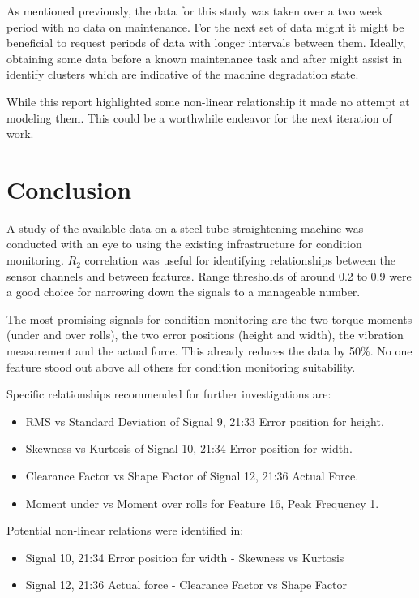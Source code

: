 \documentclass[]{article}
\begin{document}
As mentioned previously, the data for this study was taken over a two week period with no data on maintenance. For the next set of data might it might be beneficial to request periods of data with longer intervals between them. Ideally, obtaining some data before a known maintenance task and after might assist in identify clusters which are indicative of the machine degradation state.

While this report highlighted some non-linear relationship it made no attempt at modeling them. This could be a worthwhile endeavor for the next iteration of work.
\clearpage

\section{Conclusion}
A study of the available data on a steel tube straightening machine was conducted with an eye to using the existing infrastructure for condition monitoring. $R_2$ correlation was useful for identifying relationships between the sensor channels and between features. Range thresholds of around 0.2 to 0.9 were a good choice for narrowing down the signals to a manageable number.

The most promising signals for condition monitoring are the two torque moments (under and over rolls), the two error positions (height and width), the vibration measurement and the actual force. This already reduces the data by 50\%. No one feature stood out above all others for condition monitoring suitability.

Specific relationships recommended for further investigations are:
\begin{itemize}
\item \gls{RMS} vs Standard Deviation of Signal 9, 21:33 Error position for height.
\item Skewness vs Kurtosis of Signal 10, 21:34 Error position for width.
\item Clearance Factor vs Shape Factor of Signal 12, 21:36 Actual Force.
\item Moment under vs Moment over rolls for Feature 16, Peak Frequency 1.
\end{itemize}

Potential non-linear relations were identified in:
\begin{itemize}
\item Signal 10, 21:34 Error position for width - Skewness vs Kurtosis
\item Signal 12, 21:36 Actual force - Clearance Factor vs Shape Factor
\end{itemize}
\newpage
\end{document}
